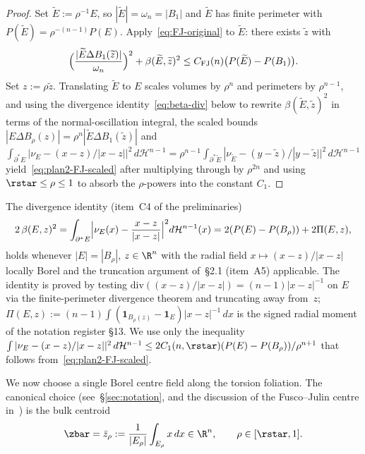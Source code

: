 \begin{proof}
Set $\widetilde E:=\rho^{-1}E$, so $|\widetilde E|=\omega_n=|B_1|$ and
$\widetilde E$ has finite perimeter with
$P(\widetilde E)=\rho^{-(n-1)}P(E)$. Apply~\eqref{eq:FJ-original} to
$\widetilde E$: there exists $\widetilde z$ with
\begin{equation}\label{eq:FJ-applied}
   \Bigl(\frac{|\widetilde E\Delta B_1(\widetilde z)|}{\omega_n}\Bigr)^2
   +\beta(\widetilde E,\widetilde z)^2
   \le C_{\mathrm{FJ}}(n)\bigl(P(\widetilde E)-P(B_1)\bigr).
\end{equation}
Set $z:=\rho\widetilde z$. Translating $\widetilde E$ to $E$ scales
volumes by $\rho^n$ and perimeters by $\rho^{n-1}$, and using the
divergence identity~\eqref{eq:beta-div} below to rewrite
$\beta(\widetilde E,\widetilde z)^2$ in terms of the
normal-oscillation integral, the scaled bounds
$|E\Delta B_\rho(z)|=\rho^n|\widetilde E\Delta B_1(\widetilde z)|$
and $\int_{\partial^*E}|\nu_E-(x-z)/|x-z||^2\,d\mathcal H^{n-1}
=\rho^{n-1}\int_{\partial^*\widetilde E}|\nu_{\widetilde E}-(y-\widetilde z)/|y-\widetilde z||^2\,d\mathcal H^{n-1}$
yield~\eqref{eq:plan2-FJ-scaled} after multiplying through by $\rho^{2n}$
and using $\rstar\le\rho\le1$ to absorb the $\rho$-powers into the
constant $C_1$.
\end{proof}

\begin{remark}\label{rmk:FJ-equiv}
The divergence identity (item~C4 of the preliminaries)
\begin{equation}\label{eq:beta-div}
   2\,\beta(E,z)^2
   = \int_{\partial^*E}\Bigl|\nu_E(x)-\frac{x-z}{|x-z|}\Bigr|^2 d\mathcal H^{n-1}(x)
   = 2(P(E)-P(B_\rho))+2\Pi(E,z),
\end{equation}
holds whenever $|E|=|B_\rho|$, $z\in\R^n$ with the radial field
$x\mapsto(x-z)/|x-z|$ locally Borel and the truncation argument
of~\S2.1 (item~A5) applicable. The identity is proved by testing
$\mathrm{div}((x-z)/|x-z|)=(n-1)|x-z|^{-1}$ on $E$ via the finite-perimeter
divergence theorem and truncating away from~$z$;
$\Pi(E,z):=(n-1)\int (\mathbf1_{B_\rho(z)}-\mathbf1_E)|x-z|^{-1}\,dx$ is the
signed radial moment of the notation register \S13. We use only the
inequality
$\int|\nu_E-(x-z)/|x-z||^2\,d\mathcal H^{n-1}\le 2C_1(n,\rstar)(P(E)-P(B_\rho))/\rho^{n+1}$
that follows from~\eqref{eq:plan2-FJ-scaled}.
\end{remark}

We now choose a single Borel centre field along the torsion foliation.
The canonical choice (see~\S\ref{sec:notation}, and the discussion of the
Fusco--Julin centre in~\cite[Thm.~1.1]{FJ2014})
is the bulk centroid
\begin{equation}\label{eq:centroid-def}
   \zbar
   = \bar z_\rho
   :=\frac{1}{|E_\rho|}\int_{E_\rho}x\,dx
   \in\R^n,\qquad\rho\in[\rstar,1].
\end{equation}

